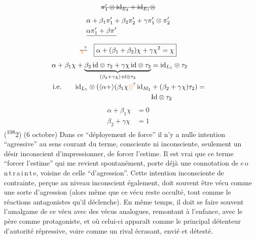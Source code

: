 \[
\deleted{\pi'_1\otimes\mathrm{id}_{E_2}+\mathrm{id}_{E_1}\otimes}
\]
\[
\begin{aligned}
&\alpha+\beta_1\pi'_1+\beta_2\pi'_2+\gamma\pi'_1\otimes\pi'_2\\
&\deleted{\alpha\pi'_1+\beta\pi'}
\end{aligned}
\]
\[
\deleted{\unsure{\chi}}\quad\boxed{\alpha+(\beta_1+\beta_2)\chi+\gamma\chi^2=\chi}
\]
\[
\begin{aligned}
\alpha+\beta_1\chi+
\underbrace{\beta_2\,\mathrm{id}\otimes\tau_2+\gamma\chi\,\mathrm{id}\otimes\tau_2}_{(\beta_2+\gamma\chi)\,\mathrm{id}\otimes\tau_2}
&=\mathrm{id}_{L_1}\otimes\tau_2\\
\text{i.e.}\qquad \mathrm{id}_{L_1}\otimes(\inserted{\alpha+}(\beta_1\chi\unsure{)|{}}\,\mathrm{id}_{M_2}
&+(\beta_2+\gamma\chi)\tau_2)=\\
&\mathrm{Id}\otimes\tau_2
\end{aligned}
\]
\[
\boxed{\begin{aligned}
\alpha+\beta_1\chi&=0\\
\beta_2+\gamma\chi&=1
\end{aligned}}
\]
(\textsuperscript{108}2) (6 octobre) Dans ce ``déployement de force'' il n'y a nulle intention ``agressive'' au sens courant du terme, consciente ni inconsciente, seulement un désir inconscient d'impressionner, de forcer l'estime. Il est vrai que ce terme ``forcer l'estime'' qui me revient spontanément, porte déjà une connotation de c\,o\,n\,t\,r\,a\,i\,n\,t\,e, voisine de celle ``d'agression''. Cette intention inconsciente de contrainte, perçue au niveau inconscient également, doit souvent être vécu comme une sorte d'agression (alors même que ce vécu reste occulté, tout comme le réactions antagonistes qu'il déclenche). En même temps, il doit se faire souvent l'amalgame de ce vécu avec des vécus analogues, remontant à l'enfance, avec le père comme protagoniste, et où celui-ci apparaît comme le principal détenteur d'autorité répressive, voire comme un rival écrasant, envié et détesté.

